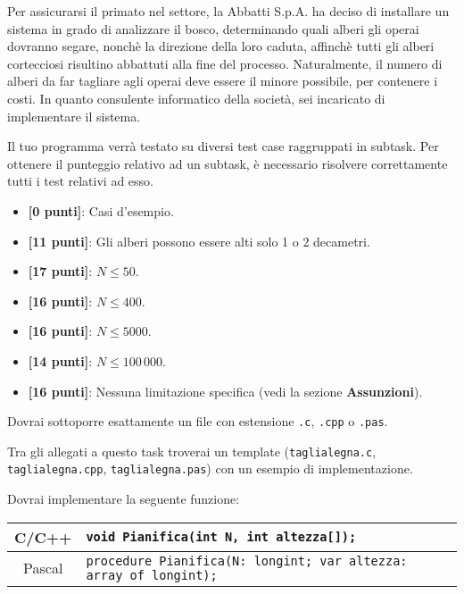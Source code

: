 Per assicurarsi il primato nel settore, la Abbatti S.p.A. ha deciso di installare un sistema in grado di analizzare il bosco, determinando quali alberi gli operai dovranno segare, nonchè la direzione della loro caduta, affinchè tutti gli alberi cortecciosi risultino abbattuti alla fine del processo. Naturalmente, il numero di alberi da far tagliare agli operai deve essere il minore possibile, per contenere i costi. In quanto consulente informatico della società, sei incaricato di implementare il sistema.

\Scoring
Il tuo programma verrà testato su diversi test case raggruppati in subtask.
Per ottenere il punteggio relativo ad un subtask, è necessario risolvere
correttamente tutti i test relativi ad esso.

\begin{itemize}[nolistsep,itemsep=2mm]
\item \textbf{ [0 punti]}: Casi d'esempio.
\item \textbf{ [11 punti]}: Gli alberi possono essere alti solo 1 o 2 decametri.
\item \textbf{ [17 punti]}: ${N} \le 50$.
\item \textbf{ [16 punti]}: ${N} \le 400$.
\item \textbf{ [16 punti]}: ${N} \le 5000$.
\item \textbf{ [14 punti]}: ${N} \le 100\,000$.
\item \textbf{ [16 punti]}: Nessuna limitazione specifica (vedi la sezione \textbf{Assunzioni}).
\end{itemize}

\Implementation

Dovrai sottoporre esattamente un file con estensione \texttt{.c}, \texttt{.cpp} o \texttt{.pas}.

\begin{warning}
Tra gli allegati a questo task troverai un template (\texttt{taglialegna.c}, \texttt{taglialegna.cpp}, \texttt{taglialegna.pas}) con un esempio di implementazione.
\end{warning}

Dovrai implementare la seguente funzione:

\begin{center}\begin{tabularx}{\textwidth}{|c|X|}
\hline
C/C++  & \verb|void Pianifica(int N, int altezza[]);|\\ %
\hline
Pascal & \verb|procedure Pianifica(N: longint; var altezza: array of longint);|\\
\hline
\end{tabularx}\end{center}


